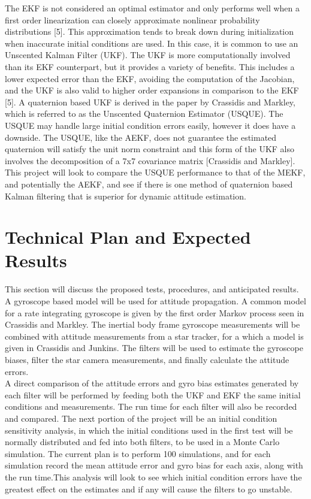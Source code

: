 \documentclass[12pt]{report}
\begin{document}
\noindent The EKF is not considered an optimal estimator and only performs well when a first order linearization can closely approximate nonlinear probability distributions [5]. This approximation tends to break down during initialization when inaccurate initial conditions are used. In this case, it is common to use an Unscented Kalman Filter (UKF). The UKF is more computationally involved than its EKF counterpart, but it provides a variety of benefits. This includes a lower expected error than the EKF, avoiding the computation of the Jacobian, and the UKF is also valid to higher order expansions in comparison to the EKF [5]. A quaternion based UKF is derived in the paper by Crassidis and Markley, which is referred to as the Unscented Quaternion Estimator (USQUE). The USQUE may handle large initial condition errors easily, however it does have a downside. The USQUE, like the AEKF, does not guarantee the estimated quaternion will satisfy the unit norm constraint and this form of the UKF also involves the decomposition of a 7x7 covariance matrix [Crassidis and Markley]. This project will look to compare the USQUE performance to that of the MEKF, and potentially the AEKF, and see if there is one method of quaternion based Kalman filtering that is superior for dynamic attitude estimation.\\

\section*{Technical Plan and Expected Results}
\noindent This section will discuss the proposed tests, procedures, and anticipated results. A gyroscope based model will be used for attitude propagation. A common model for a rate integrating gyroscope is given by the first order Markov process seen in Crassidis and Markley. The inertial body frame gyroscope measurements will be combined with attitude measurements from a star tracker, for a which a model is given in Crassidis and Junkins. The filters will be used to estimate the gyroscope biases, filter the star camera measurements, and finally calculate the attitude errors.\\ 

\noindent A direct comparison of the attitude errors and gyro bias estimates generated by each filter will be performed by feeding both the UKF and EKF the same initial conditions and measurements. The run time for each filter will also be recorded and compared. The next portion of the project will be an initial condition sensitivity analysis, in which the initial conditions used in the first test will be normally distributed and fed into both filters, to be used in a Monte Carlo simulation. The current plan is to perform 100 simulations, and for each simulation record the mean attitude error and gyro bias for each axis, along with the run time.This analysis will look to see which initial condition errors have the greatest effect on the estimates and if any will cause the filters to go unstable. \\
\end{document}
